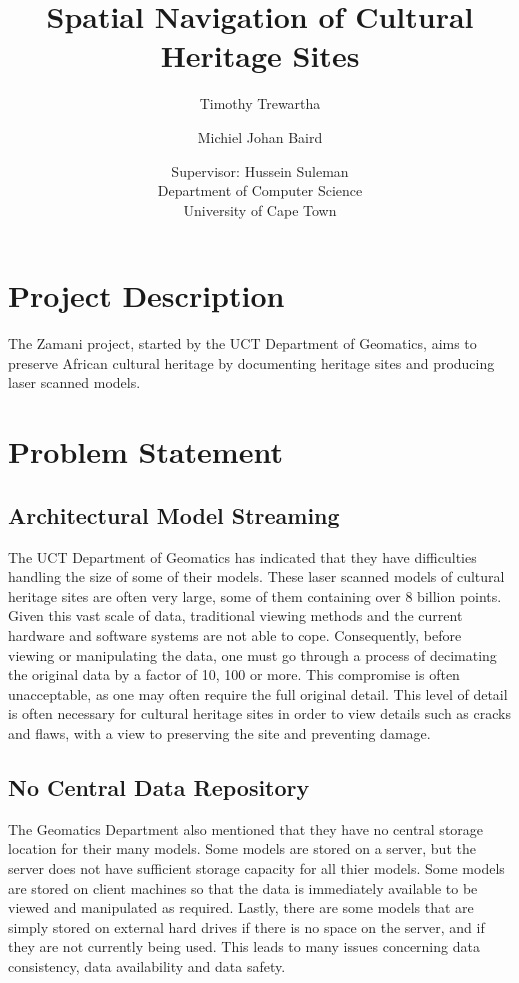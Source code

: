 \documentclass[12pt,a4paper]{article}
\begin{document}
\author{Timothy Trewartha \\
\and
Michiel Johan Baird \\
\and
Supervisor: Hussein Suleman \\
Department of Computer Science \\
University of Cape Town
 }
\title{Spatial Navigation of Cultural Heritage Sites}
\maketitle
{}
\tableofcontents
\newpage

\section{Project Description}
The Zamani project, started by the UCT Department of Geomatics, aims to preserve African cultural heritage by documenting heritage sites and producing laser scanned models.

\section{Problem Statement}
\subsection{Architectural Model Streaming}
The UCT Department of Geomatics has indicated that they have difficulties handling the size of some of their models. These laser scanned models of cultural heritage sites are often very large, some of them containing over 8 billion points. Given this vast scale of data, traditional viewing methods and the current hardware and software systems are not able to cope.  Consequently, before viewing or manipulating the data, one must go through a process of decimating the original data by a factor of 10, 100 or more. This compromise is often unacceptable, as one may often require the full original detail. This level of detail is often necessary for cultural heritage sites in order to view details such as cracks and flaws, with a view to preserving the site and preventing damage.
\subsection{No Central Data Repository}
The Geomatics Department also mentioned that they have no central storage location for their many models. Some models are stored on a server, but the server does not have sufficient storage capacity for all thier models. Some models are stored on client machines so that the data is immediately available to be viewed and manipulated as required. Lastly, there are some models that are simply stored on external hard drives if there is no space on the server, and if they are not currently being used. This leads to many issues concerning data consistency, data availability and data safety.
\end{document}
